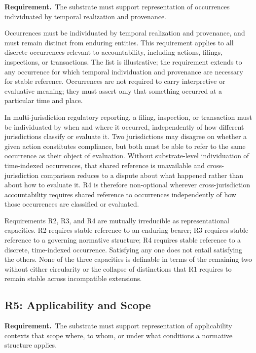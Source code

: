 \textbf{Requirement.}~The substrate must support representation of occurrences individuated
by temporal realization and provenance.

Occurrences must be individuated by temporal realization and provenance,
and must remain distinct from enduring entities.
This requirement applies to all discrete occurrences
relevant to accountability, including actions, filings, inspections, or transactions.
The list is illustrative; the requirement extends to any occurrence
for which temporal individuation and provenance are necessary for stable reference.
Occurrences are not required to carry interpretive or evaluative meaning; they
must assert only that something occurred at a particular time and place.

In multi-jurisdiction regulatory reporting, a filing, inspection, or
transaction must be individuated by when and where it occurred,
independently of how different jurisdictions classify or evaluate it.
Two jurisdictions may disagree on whether a given action constitutes
compliance, but both must be able to refer to the same occurrence as
their object of evaluation.
Without substrate-level individuation of time-indexed occurrences,
that shared reference is unavailable and cross-jurisdiction comparison
reduces to a dispute about what happened rather than
about how to evaluate it.
R4 is therefore non-optional wherever cross-jurisdiction accountability
requires shared reference to occurrences
independently of how those occurrences are classified or evaluated.

Requirements R2, R3, and R4 are mutually irreducible as representational capacities.
R2 requires stable reference to an enduring bearer;
R3 requires stable reference to a governing normative structure;
R4 requires stable reference to a discrete, time-indexed occurrence.
Satisfying any one does not entail satisfying the others.
None of the three capacities is definable in terms of the remaining two
without either circularity or the collapse of distinctions that
R1 requires to remain stable across incompatible extensions.

\subsection{R5: Applicability and Scope}

\textbf{Requirement.}~The substrate must support representation of applicability contexts
that scope where, to whom, or under what conditions a normative
structure applies.

